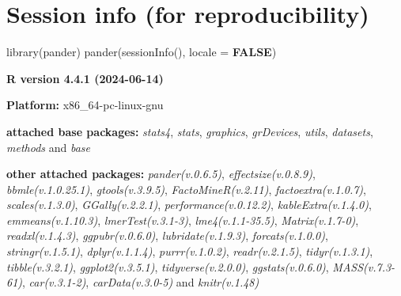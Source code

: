\documentclass[
  bookmarksnumbered]{article}
\newenvironment{Shaded}{\begin{snugshade}}{\end{snugshade}}
\newcommand{\AttributeTok}[1]{\textcolor[rgb]{0.80,0.80,0.80}{#1}}
\newcommand{\ConstantTok}[1]{\textcolor[rgb]{0.86,0.64,0.64}{\textbf{#1}}}
\newcommand{\FunctionTok}[1]{\textcolor[rgb]{0.94,0.94,0.56}{#1}}
\newcommand{\NormalTok}[1]{\textcolor[rgb]{0.80,0.80,0.80}{#1}}
\begin{document}
\begin{table}[H]
\centering
\caption{\label{tab:unnamed-chunk-18}Number and age of participants in each condition}
\centering
{}
\end{table}

\section{Session info (for reproducibility)}\label{session}

\begin{Shaded}
\begin{Highlighting}[]
\FunctionTok{library}\NormalTok{(pander)}
\FunctionTok{pander}\NormalTok{(}\FunctionTok{sessionInfo}\NormalTok{(), }\AttributeTok{locale =} \ConstantTok{FALSE}\NormalTok{)}
\end{Highlighting}
\end{Shaded}

\textbf{R version 4.4.1 (2024-06-14)}

\textbf{Platform:} x86\_64-pc-linux-gnu

\textbf{attached base packages:}
\emph{stats4}, \emph{stats}, \emph{graphics}, \emph{grDevices}, \emph{utils}, \emph{datasets}, \emph{methods} and \emph{base}

\textbf{other attached packages:}
\emph{pander(v.0.6.5)}, \emph{effectsize(v.0.8.9)}, \emph{bbmle(v.1.0.25.1)}, \emph{gtools(v.3.9.5)}, \emph{FactoMineR(v.2.11)}, \emph{factoextra(v.1.0.7)}, \emph{scales(v.1.3.0)}, \emph{GGally(v.2.2.1)}, \emph{performance(v.0.12.2)}, \emph{kableExtra(v.1.4.0)}, \emph{emmeans(v.1.10.3)}, \emph{lmerTest(v.3.1-3)}, \emph{lme4(v.1.1-35.5)}, \emph{Matrix(v.1.7-0)}, \emph{readxl(v.1.4.3)}, \emph{ggpubr(v.0.6.0)}, \emph{lubridate(v.1.9.3)}, \emph{forcats(v.1.0.0)}, \emph{stringr(v.1.5.1)}, \emph{dplyr(v.1.1.4)}, \emph{purrr(v.1.0.2)}, \emph{readr(v.2.1.5)}, \emph{tidyr(v.1.3.1)}, \emph{tibble(v.3.2.1)}, \emph{ggplot2(v.3.5.1)}, \emph{tidyverse(v.2.0.0)}, \emph{ggstats(v.0.6.0)}, \emph{MASS(v.7.3-61)}, \emph{car(v.3.1-2)}, \emph{carData(v.3.0-5)} and \emph{knitr(v.1.48)}
\end{document}
